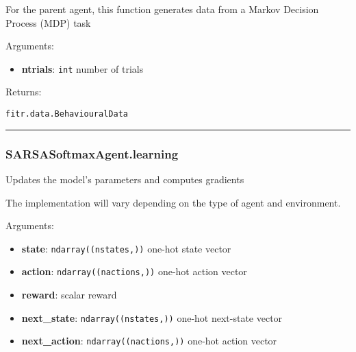 \begin{Shaded}
\begin{Highlighting}[]
\end{Highlighting}
\end{Shaded}

For the parent agent, this function generates data from a Markov
Decision Process (MDP) task

Arguments:

\begin{itemize}
\tightlist
\item
  \textbf{ntrials}: \texttt{int} number of trials
\end{itemize}

Returns:

\texttt{fitr.data.BehaviouralData}

\begin{center}\rule{0.5\linewidth}{\linethickness}\end{center}

\subsubsection{SARSASoftmaxAgent.learning}\label{sarsasoftmaxagent.learning}

\begin{Shaded}
\begin{Highlighting}[]
\end{Highlighting}
\end{Shaded}

Updates the model's parameters and computes gradients

The implementation will vary depending on the type of agent and
environment.

Arguments:

\begin{itemize}
\tightlist
\item
  \textbf{state}: \texttt{ndarray((nstates,))} one-hot state vector
\item
  \textbf{action}: \texttt{ndarray((nactions,))} one-hot action vector
\item
  \textbf{reward}: scalar reward
\item
  \textbf{next\_state}: \texttt{ndarray((nstates,))} one-hot next-state
  vector
\item
  \textbf{next\_action}: \texttt{ndarray((nactions,))} one-hot action
  vector
\end{itemize}

